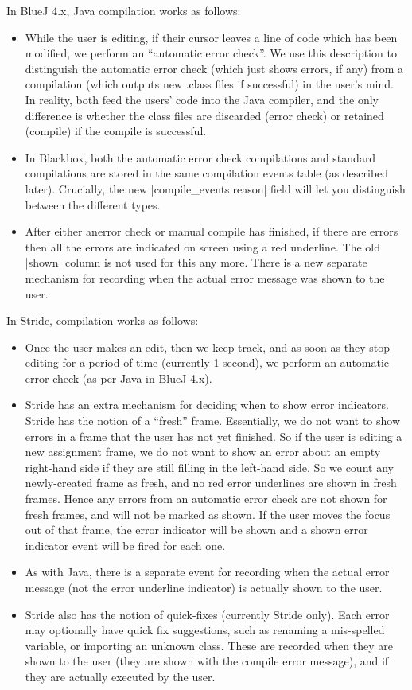 \documentclass{report}
\begin{document}
In BlueJ 4.x, Java compilation works as follows:
\begin{itemize}
\item While the user is editing, if their cursor leaves a line of code which has been
modified, we perform an ``automatic error check''.  We use this description to
distinguish the automatic error check (which just shows
errors, if any) from a compilation (which outputs new .class files if successful) in
the user's mind.  In reality, both feed the users' code into the Java compiler, and the
only difference is whether the class files are discarded (error check) or retained (compile)
if the compile is successful.
\item In Blackbox, both the automatic error check compilations and standard compilations
 are stored in the same compilation events table (as described later).
 Crucially, the new |compile_events.reason| field will let you distinguish between
 the different types.
\item After either  anerror check or manual compile has finished, if there are errors then
all the errors are indicated on screen using a red underline.  The old |shown| column is not used for this any more.  There is a new separate
mechanism for recording when the actual error message was shown to the user.
\end{itemize}

In Stride, compilation works as follows:
\begin{itemize}
\item Once the user makes an edit, then we keep track, and as soon as they stop editing
for a period of time (currently 1 second), we perform an automatic error check (as per
Java in BlueJ 4.x).
\item Stride has an extra mechanism for deciding when to show error indicators.  Stride
has the notion of a ``fresh'' frame.  Essentially, we do not want to show errors in a frame
that the user has not yet finished.  So if the user is editing a new assignment frame, we do
not want to show an error about an empty right-hand side if they are still filling in the
 left-hand side.  So we count any newly-created frame as fresh, and no red error underlines
 are shown in fresh frames.  Hence any errors from an automatic error check are not shown for
 fresh frames, and will not be marked as shown.  If the user moves the focus out of that frame,
 the error indicator will be shown and a shown error indicator event will be fired for each one.
\item As with Java, there is a separate event for recording when the actual error message
(not the error underline indicator) is actually shown to the user.
\item Stride also has the notion of quick-fixes (currently Stride only).  Each error may optionally
have quick fix suggestions, such as renaming a mis-spelled variable, or importing an unknown class.
These are recorded when they are shown to the user (they are shown with the compile error message), and if they are actually executed by the user.
\end{itemize}
\end{document}
